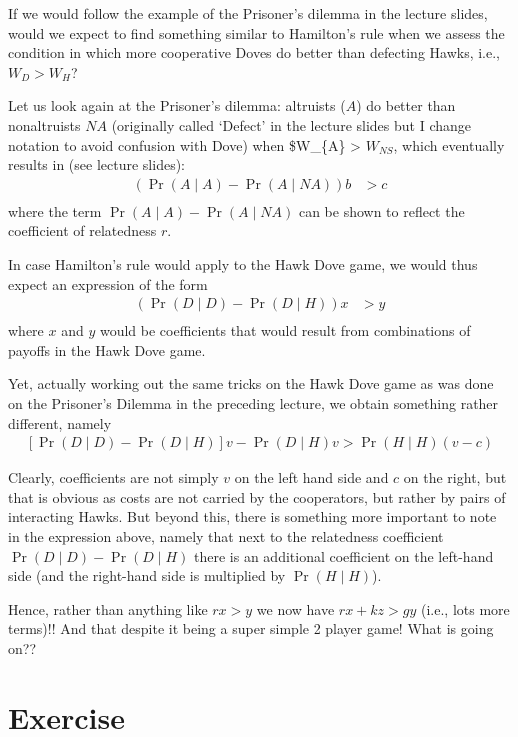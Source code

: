 \documentclass[
]{book}
\begin{document}
If we would follow the example of the Prisoner's dilemma in the lecture slides, would we expect to find something similar to Hamilton's rule when we assess the condition in which more cooperative Doves do better than defecting Hawks, i.e., \(W_{D} > W_{H}\)?

Let us look again at the Prisoner's dilemma: altruists (\(A\)) do better than nonaltruists \(NA\) (originally called `Defect' in the lecture slides but I change notation to avoid confusion with Dove) when \$W\_\{A\} \textgreater{} \(W_{NS}\), which eventually results in (see lecture slides):
\begin{align}
\left( \Pr(A \mid A ) - \Pr(A \mid NA ) \right ) b &> c \\
\end{align}
where the term \(\Pr(A \mid A ) - \Pr(A \mid NA )\) can be shown to reflect the coefficient of relatedness \(r\).

In case Hamilton's rule would apply to the Hawk Dove game, we would thus expect an expression of the form
\begin{align}
\left(\Pr(D \mid D) - \Pr(D \mid H ) \right ) x &> y \\
\end{align}
where \(x\) and \(y\) would be coefficients that would result from combinations of payoffs in the Hawk Dove game.

Yet, actually working out the same tricks on the Hawk Dove game as was done on the Prisoner's Dilemma in the preceding lecture, we obtain something rather different, namely
\begin{align}
\left [ \Pr (D \mid D) - \Pr ( D \mid H) \right ] v - \Pr (D \mid H) v > \Pr ( H \mid H ) \left (v - c \right )
\end{align}

Clearly, coefficients are not simply \(v\) on the left hand side and \(c\) on the right, but that is obvious as costs are not carried by the cooperators, but rather by pairs of interacting Hawks. But beyond this, there is something more important to note in the expression above, namely that next to the relatedness coefficient \(\Pr(D \mid D) - \Pr(D \mid H )\) there is an additional coefficient on the left-hand side (and the right-hand side is multiplied by \(\Pr(H\mid H)\)).

Hence, rather than anything like \(r x > y\) we now have \(r x + k z > g y\) (i.e., lots more terms)!! And that despite it being a super simple 2 player game! What is going on??

\hypertarget{exercise-7}{%
\section{Exercise}\label{exercise-7}}
\end{document}
